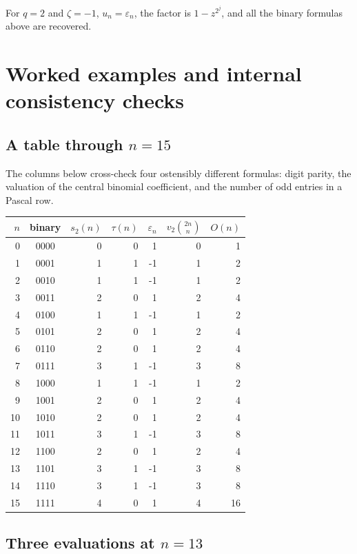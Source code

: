 \documentclass[11pt,oneside]{article}
\theoremstyle{definition}
\theoremstyle{remark}
\newcommand{\swt}{s_2}
\newcommand{\vtwo}{v_2}
\newcommand{\eps}{\varepsilon}
\newcommand{\1}{\mathbf 1}
\begin{document}
For \(q=2\) and \(\zeta=-1\), \(u_n=\eps_n\), the factor is \(1-z^{2^j}\), and all the binary
formulas above are recovered.

\section{Worked examples and internal consistency checks}
\label{p3:sec:examples}

\subsection{A table through \(n=15\)}

The columns below cross-check four ostensibly different formulas: digit parity, the valuation
of the central binomial coefficient, and the number of odd entries in a Pascal row.

\begin{center}
\small
\begin{tabular}{@{}rcrrrrr@{}}
\toprule
\(n\) & binary & \(\swt(n)\) & \(\tau(n)\) & \(\eps_n\) &
\(\vtwo\binom{2n}{n}\) & \(O(n)\)\\
\midrule
0  & 0000 & 0 & 0 &  1 & 0 & 1\\
1  & 0001 & 1 & 1 & -1 & 1 & 2\\
2  & 0010 & 1 & 1 & -1 & 1 & 2\\
3  & 0011 & 2 & 0 &  1 & 2 & 4\\
4  & 0100 & 1 & 1 & -1 & 1 & 2\\
5  & 0101 & 2 & 0 &  1 & 2 & 4\\
6  & 0110 & 2 & 0 &  1 & 2 & 4\\
7  & 0111 & 3 & 1 & -1 & 3 & 8\\
8  & 1000 & 1 & 1 & -1 & 1 & 2\\
9  & 1001 & 2 & 0 &  1 & 2 & 4\\
10 & 1010 & 2 & 0 &  1 & 2 & 4\\
11 & 1011 & 3 & 1 & -1 & 3 & 8\\
12 & 1100 & 2 & 0 &  1 & 2 & 4\\
13 & 1101 & 3 & 1 & -1 & 3 & 8\\
14 & 1110 & 3 & 1 & -1 & 3 & 8\\
15 & 1111 & 4 & 0 &  1 & 4 & 16\\
\bottomrule
\end{tabular}
\end{center}

\subsection{Three evaluations at \(n=13\)}
\end{document}

